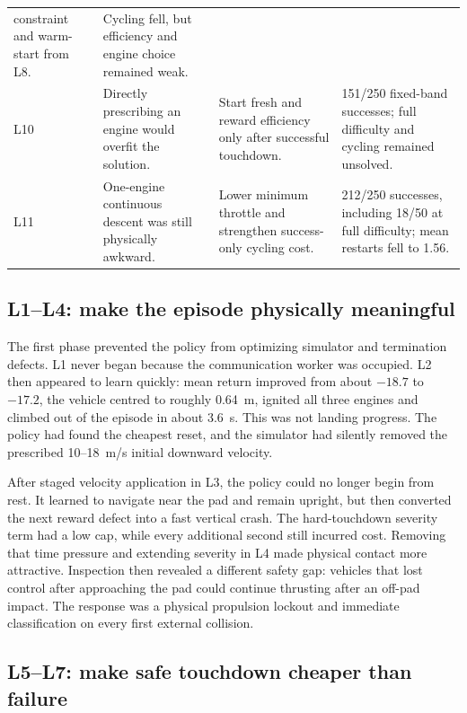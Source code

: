 \begin{longtable}{p{}p{}p{}p{}}
  constraint and warm-start from L8. & Cycling fell, but efficiency and engine choice remained
  weak. \\
  L10 & Directly prescribing an engine would overfit the solution. & Start fresh and reward
  efficiency only after successful touchdown. & 151/250 fixed-band successes; full difficulty
  and cycling remained unsolved. \\
  L11 & One-engine continuous descent was still physically awkward. & Lower minimum throttle and
  strengthen success-only cycling cost. & 212/250 successes, including 18/50 at full difficulty;
  mean restarts fell to 1.56. \\
  \bottomrule
\end{longtable}
\normalsize

\subsection{L1--L4: make the episode physically meaningful}

The first phase prevented the policy from optimizing simulator and termination defects. L1
never began because the communication worker was occupied. L2 then appeared to learn quickly:
mean return improved from about $-18.7$ to $-17.2$, the vehicle centred to roughly
\SI{0.64}{m}, ignited all three engines and climbed out of the episode in about \SI{3.6}{s}.
This was not landing progress. The policy had found the cheapest reset, and the simulator had
silently removed the prescribed 10--\SI{18}{m/s} initial downward velocity.

After staged velocity application in L3, the policy could no longer begin from rest. It learned
to navigate near the pad and remain upright, but then converted the next reward defect into a
fast vertical crash. The hard-touchdown severity term had a low cap, while every additional
second still incurred cost. Removing that time pressure and extending severity in L4 made
physical contact more attractive. Inspection then revealed a different safety gap: vehicles
that lost control after approaching the pad could continue thrusting after an off-pad impact.
The response was a physical propulsion lockout and immediate classification on every first
external collision.

\subsection{L5--L7: make safe touchdown cheaper than failure}

